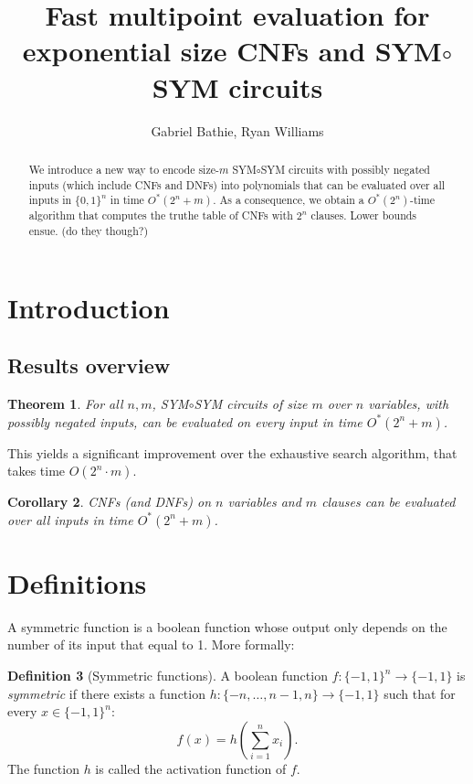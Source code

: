 \documentclass[a4paper, 11pt]{article}
\title{Fast multipoint evaluation for exponential size CNFs and SYM$\circ$SYM circuits}
\author{Gabriel Bathie, Ryan Williams}
\theoremstyle{plain}
\newtheorem{theorem}{Theorem}[section] %
\newtheorem{corollary}[theorem]{Corollary}
\theoremstyle{definition}
\newtheorem{definition}[theorem]{Definition}
\theoremstyle{remark}
\newcommand{\bit}{\{0,1\}}%
\newcommand{\mbit}{\{-1,1\}}%
\newcommand{\ssym}{\textsf{SYM$\circ$SYM}}%
\begin{document}
\maketitle

\begin{abstract}
We introduce a new way to encode size-$m$ \ssym{} circuits with possibly negated inputs
(which include CNFs and DNFs)
into polynomials that can be evaluated over all inputs in $\bit^n$ in time $O^*(2^n + m)$.
As a consequence, we obtain a $O^*(2^n)$-time algorithm that computes the
truthe table of CNFs with $2^n$ clauses.
Lower bounds ensue. (do they though?)
\end{abstract}

\section{Introduction}

\subsection{Results overview}

\begin{theorem}
	For all $n, m$, \ssym{} circuits of size $m$ over $n$ variables, with possibly negated inputs, can be evaluated
	on every input in time $O^*(2^n + m)$.
\end{theorem}

This yields a significant improvement over the exhaustive search algorithm, that takes time $O(2^n\cdot m)$.

\begin{corollary}
	CNFs (and DNFs) on $n$ variables and $m$ clauses can be evaluated
	over all inputs in time $O^*(2^n + m)$.
\end{corollary}

\section{Definitions}

A symmetric function is a boolean function whose output only depends on the number of 
its input that equal to 1.
More formally:
\begin{definition}[Symmetric functions]
	A boolean function $f: \mbit^n \rightarrow \mbit$ is \textit{symmetric} 
	if there exists a function
	$h: \{-n,\ldots, n-1, n\} \rightarrow \mbit$ such that for every $x\in\mbit^n$:
	\[f(x) = h\left(\sum_{i=1}^n x_i\right).\]
	The function $h$ is called the activation function of $f$.
\end{definition}
\end{document}
